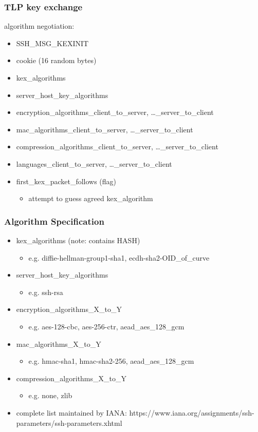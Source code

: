 \subsubsection{TLP key exchange}
algorithm negotiation:
\begin{itemize}[itemsep=0pt]
    \item SSH\_MSG\_KEXINIT
    \item cookie (16 random bytes)
    \item kex\_algorithms
    \item server\_host\_key\_algorithms
    \item encryption\_algorithms\_client\_to\_server, …\_server\_to\_client
    \item mac\_algorithms\_client\_to\_server, …\_server\_to\_client
    \item compression\_algorithms\_client\_to\_server, …\_server\_to\_client
    \item languages\_client\_to\_server, …\_server\_to\_client
    \item first\_kex\_packet\_follows (flag)
    \begin{itemize}
        \item attempt to guess agreed kex\_algorithm
    \end{itemize}
\end{itemize}

\subsubsection{Algorithm Specification}
\begin{itemize}[itemsep=0pt]
    \item kex\_algorithms (note: contains HASH)
    \begin{itemize}
        \item e.g. diffie-hellman-group1-sha1, ecdh-sha2-OID\_of\_curve
    \end{itemize}
    \item server\_host\_key\_algorithms
    \begin{itemize}
        \item e.g. ssh-rsa
    \end{itemize}
    \item encryption\_algorithms\_X\_to\_Y
    \begin{itemize}
        \item e.g. aes-128-cbc, aes-256-ctr, aead\_aes\_128\_gcm
    \end{itemize}
    \item mac\_algorithms\_X\_to\_Y
    \begin{itemize}
        \item e.g. hmac-sha1, hmac-sha2-256, aead\_aes\_128\_gcm
    \end{itemize}
    \item compression\_algorithms\_X\_to\_Y
    \begin{itemize}
        \item e.g. none, zlib
    \end{itemize}
    \item complete list maintained by IANA: https://www.iana.org/assignments/ssh-parameters/ssh-parameters.xhtml
\end{itemize}

